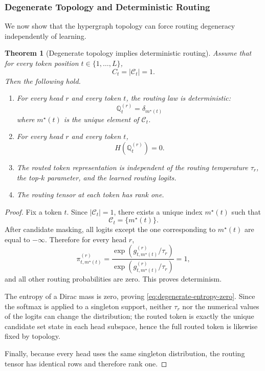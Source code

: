 \documentclass{article}
\theoremstyle{plain}
\newtheorem{theorem}{Theorem}[section]
\theoremstyle{definition}
\theoremstyle{remark}
\begin{document}
\subsubsection{Degenerate Topology and Deterministic Routing}
\label{sec:tier-a-degenerate-topology}

We now show that the hypergraph topology can force routing degeneracy independently of learning.

\begin{theorem}[Degenerate topology implies deterministic routing]
\label{thm:degenerate-topology}
Assume that for every token position $t \in \{1,\dots,L\}$,
\begin{equation}
\label{eq:degenerate-candidate-condition}
C_{t}=|\mathcal{C}_{t}|=1.
\end{equation}
Then the following hold.

\begin{enumerate}
    \item For every head $r$ and every token $t$, the routing law is deterministic:
    \[
    \mathbb{Q}^{(r)}_{t} = \delta_{m^\star(t)}
    \]
    where $m^\star(t)$ is the unique element of $\mathcal{C}_{t}$.

    \item For every head $r$ and every token $t$,
    \begin{equation}
    \label{eq:degenerate-entropy-zero}
    H\!\left(\mathbb{Q}^{(r)}_{t}\right)=0.
    \end{equation}

    \item The routed token representation is independent of the routing temperature $\tau_r$, the top-$k$ parameter, and the learned routing logits.

    \item The routing tensor at each token has rank one.
\end{enumerate}
\end{theorem}

\begin{proof}
Fix a token $t$. Since $|\mathcal{C}_{t}|=1$, there exists a unique index $m^\star(t)$ such that
\[
\mathcal{C}_{t}=\{m^\star(t)\}.
\]
After candidate masking, all logits except the one corresponding to $m^\star(t)$ are equal to $-\infty$. Therefore for every head $r$,
\[
\pi^{(r)}_{t,m^\star(t)}
=
\frac{\exp(g^{(r)}_{t,m^\star(t)}/\tau_r)}
{\exp(g^{(r)}_{t,m^\star(t)}/\tau_r)}
=
1,
\]
and all other routing probabilities are zero. This proves determinism.

The entropy of a Dirac mass is zero, proving \eqref{eq:degenerate-entropy-zero}. Since the softmax is applied to a singleton support, neither $\tau_r$ nor the numerical values of the logits can change the distribution; the routed token is exactly the unique candidate set state in each head subspace, hence the full routed token is likewise fixed by topology.

Finally, because every head uses the same singleton distribution, the routing tensor has identical rows and therefore rank one.
\end{proof}
\end{document}
